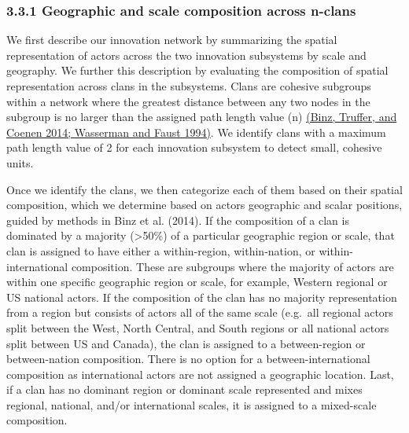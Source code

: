 \documentclass[twoside,12pt,final]{ucthesis-CA2012}
\begin{document}
\begin{ucmainmatter}
\hypertarget{geographic-and-scale-composition-across-n-clans}{%
\subsubsection{3.3.1 Geographic and scale composition across n-clans}\label{geographic-and-scale-composition-across-n-clans}}

We first describe our innovation network by summarizing the spatial
representation of actors across the two innovation subsystems by scale
and geography. We further this description by evaluating the composition
of spatial representation across clans in the subsystems. Clans are
cohesive subgroups within a network where the greatest distance between
any two nodes in the subgroup is no larger than the assigned path length
value (n) \href{https://www.zotero.org/google-docs/?NwU9V6}{(Binz, Truffer, and Coenen 2014; Wasserman and Faust
1994)}. We identify clans
with a maximum path length value of 2 for each innovation subsystem to
detect small, cohesive units.

Once we identify the clans, we then categorize each of them based on
their spatial composition, which we determine based on actors\textquotesingle{}
geographic and scalar positions, guided by methods in Binz et al.
(2014). If the composition of a clan is dominated by a majority (\textgreater50\%)
of a particular geographic region or scale, that clan is assigned to
have either a \textquotesingle within-region\textquotesingle, \textquotesingle within-nation\textquotesingle, or
\textquotesingle within-international\textquotesingle{} composition. These are subgroups where the
majority of actors are within one specific geographic region or scale,
for example, Western regional or US national actors. If the composition
of the clan has no majority representation from a region but consists of
actors all of the same scale (e.g.~all regional actors split between the
West, North Central, and South regions or all national actors split
between US and Canada), the clan is assigned to a \textquotesingle between-region\textquotesingle{} or
\textquotesingle between-nation\textquotesingle{} composition. There is no option for a
\textquotesingle between-international\textquotesingle{} composition as international actors are not
assigned a geographic location. Last, if a clan has no dominant region
or dominant scale represented and mixes regional, national, and/or
international scales, it is assigned to a \textquotesingle mixed-scale\textquotesingle{} composition.


\end{ucmainmatter}
\end{document}
